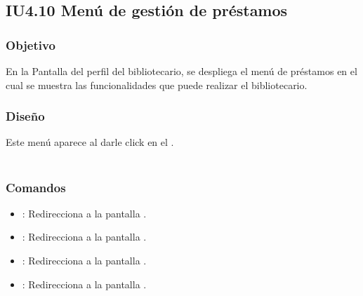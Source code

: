 \newpage
\subsection{IU4.10 Menú de gestión de préstamos}

\subsubsection{Objetivo}
	En la Pantalla del perfil del bibliotecario, se despliega el menú de préstamos en el cual se muestra las funcionalidades que puede realizar el bibliotecario.  

\subsubsection{Diseño}
	Este menú aparece al darle click en el .  \\\\


\subsubsection{Comandos}
	\begin{itemize}
		\item {}: Redirecciona a la pantalla .
		\item {}: Redirecciona a la pantalla .
		\item {}: Redirecciona a la pantalla .
		\item {}: Redirecciona a la pantalla .
	\end{itemize}
